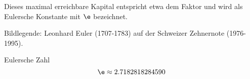 Dieses maximal erreichbare Kapital entspricht etwa dem Faktor  und
wird als Eulersche Konstante mit $\e$ bezeichnet.

Bildlegende: Leonhard Euler (1707-1783) auf der Schweizer Zehnernote (1976-1995).

\begin{definition}{Eulersche Zahl}{}
$$\e \approx 2.7182818284590$$
\end{definition}
\newpage
